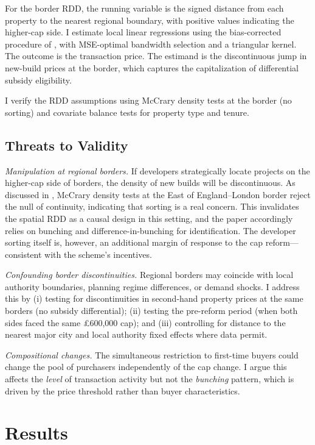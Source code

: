 \documentclass[12pt]{article}
\begin{document}
For the border RDD, the running variable is the signed distance from each property to the nearest regional boundary, with positive values indicating the higher-cap side. I estimate local linear regressions using the bias-corrected procedure of \citet{calonico2014robust}, with MSE-optimal bandwidth selection and a triangular kernel. The outcome is the transaction price. The estimand is the discontinuous jump in new-build prices at the border, which captures the capitalization of differential subsidy eligibility.

I verify the RDD assumptions using McCrary density tests \citep{rddensity} at the border (no sorting) and covariate balance tests for property type and tenure.

\subsection{Threats to Validity}

\textit{Manipulation at regional borders.} If developers strategically locate projects on the higher-cap side of borders, the density of new builds will be discontinuous. As discussed in , McCrary density tests at the East of England--London border reject the null of continuity, indicating that sorting is a real concern. This invalidates the spatial RDD as a causal design in this setting, and the paper accordingly relies on bunching and difference-in-bunching for identification. The developer sorting itself is, however, an additional margin of response to the cap reform---consistent with the scheme's incentives.

\textit{Confounding border discontinuities.} Regional borders may coincide with local authority boundaries, planning regime differences, or demand shocks. I address this by (i) testing for discontinuities in second-hand property prices at the same borders (no subsidy differential); (ii) testing the pre-reform period (when both sides faced the same \pounds600,000 cap); and (iii) controlling for distance to the nearest major city and local authority fixed effects where data permit.

\textit{Compositional changes.} The simultaneous restriction to first-time buyers could change the pool of purchasers independently of the cap change. I argue this affects the \textit{level} of transaction activity but not the \textit{bunching} pattern, which is driven by the price threshold rather than buyer characteristics.


\section{Results}\label{sec:results}
\end{document}
